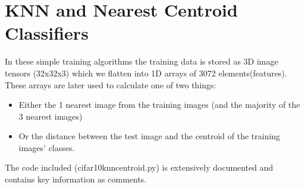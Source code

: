 \documentclass[lettersize,journal]{IEEEtran}
\begin{document}
\section{KNN and Nearest Centroid Classifiers}
In these simple training algorithms the training data is stored as 3D image tensors (32x32x3) 
which we flatten into 1D arrays of 3072 elements(features). These arrays are later used to calculate 
one of two things:
\begin{itemize}
  \item Either the 1 nearest image from the training images (and the majority of the 3 nearest images)
  \item Or the distance between the test image and the centroid of the training images' classes.
\end{itemize}
The code included (cifar10knncentroid.py) is extensively documented and contains key information 
as comments. 
\end{document}
